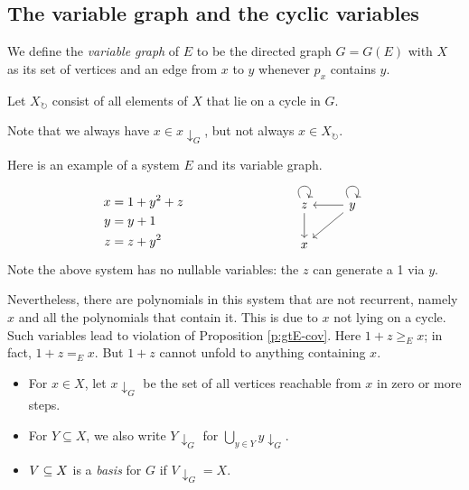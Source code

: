 \documentclass[numbers=enddot]{scrartcl}
\newcommand{\downg}[1]{{#1}{\downarrow_G}}
\newcommand{\Xcyc}{X_{\circlearrowright}}
\newcommand{\gtE}{\geq_E}
\begin{document}
\subsection{The variable graph and the cyclic variables}

\begin{dfn}
  We define the \emph{variable graph} of $E$ to be the directed graph $G = G(E)$ with $X$ as its
  set of vertices and an edge from $x$ to $y$ whenever $p_x$ contains $y$.
\end{dfn}

\begin{notn}
  Let $\Xcyc$ consist of all elements of $X$ that lie on a cycle in $G$.
\end{notn}

Note that we always have $x \in \downg{x}$, but not always $x \in \Xcyc$.

\begin{expl}
Here is an example of a system $E$ and its variable graph.
\[
\begin{aligned}
  x &= 1 + y^2 + z\\
  y &= y + 1\\
  z &= z + y^2
\end{aligned}
\hspace{3cm}
\begin{tikzcd}
	z & y \\
	x
	\arrow[from=1-1, to=1-1, loop, in=60, out=120, distance=5mm]
	\arrow[from=1-1, to=2-1]
	\arrow[from=1-2, to=1-1]
	\arrow[from=1-2, to=1-2, loop, in=60, out=120, distance=5mm]
	\arrow[from=1-2, to=2-1]
\end{tikzcd}\]
Note the above system has no nullable variables: the $z$ can generate a 1 via $y$.

Nevertheless, there are polynomials in this system that are not recurrent, namely
$x$ and all the polynomials that contain it.  This is due to $x$ not lying on a cycle.
Such variables lead to violation of Proposition \ref{p:gtE-cov}.
Here $1 + z \gtE x$; in fact, $1 + z =_E x$. But $1 + z$ cannot unfold to anything
containing $x$.
\end{expl}

\begin{dfn} \hfill
  \begin{itemize}
    \item
    For $x \in X$, let $\downg{x}$ be the set of all vertices reachable from $x$ in zero or more steps.
    \item
    For $Y \subseteq X$, we also write $\downg{Y}$ for $\bigcup_{y \in Y} \downg{y}$.
    \item
      $V \subseteq X$ is a \emph{basis} for $G$ if $\downg{V} = X$.
  \end{itemize}
\end{dfn}
\end{document}
